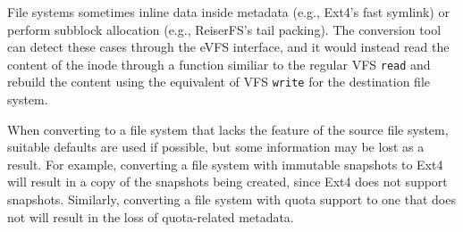 File systems sometimes inline data inside metadata (e.g., Ext4's fast symlink) or perform subblock allocation (e.g., ReiserFS's tail packing). The conversion tool can detect these cases through the eVFS interface, and it would instead read the content of the inode through a function similiar to the regular VFS \texttt{read} and rebuild the content using the equivalent of VFS \texttt{write} for the destination file system.

When converting to a file system that lacks the feature of the source file system, suitable defaults are used if possible, but some information may be lost as a result. For example, converting a file system with immutable snapshots to Ext4 will result in a copy of the snapshots being created, since Ext4 does not support snapshots. Similarly, converting a file system with quota support to one that does not will result in the loss of quota-related metadata.




